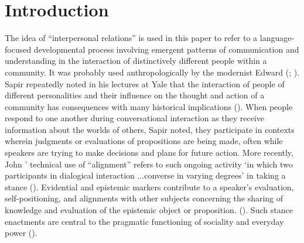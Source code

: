 \documentclass[output=paper]{langsci/langscibook}
\author{Ellen B. Basso \affiliation{University of Arizona}}
\begin{document}
\maketitle

\section{Introduction}\label{s:eb1} 

The idea of “interpersonal relations” is used in this paper to refer to a language-focused developmental process involving emergent patterns of communication and understanding in the interaction of distinctively different people within a community. It was probably used anthropologically by the modernist Edward \citeauthor{Sapir1932} (\citeyear{Sapir1932}; \citealt{Basso1998}).  Sapir repeatedly noted in his lectures at Yale that the interaction of people of different personalities and their influence on the thought and action of a community has consequences with many historical implications (\citealt[204]{Sapir1993}). When people respond to one another during conversational interaction as they receive information about the worlds of others, Sapir noted, they participate in contexts wherein  judgments or evaluations of propositions are being made, often while speakers are trying to make decisions and plans for future action.  More recently,   John \citeauthor{DuBois2004}’ technical use of “alignment” refers to such ongoing activity   ‘in which two participants in dialogical interaction ...converse in varying degrees’  in taking a stance (\citeyear[22--23]{DuBois2004}).  Evidential and epistemic markers contribute to a speaker’s evaluation, self-positioning, and alignments with other subjects concerning the sharing of knowledge and evaluation of the epistemic object or proposition. (\citealt[24]{DuBois2007}).  Such stance enactments are central to the pragmatic functioning  of sociality and everyday power (\citealt[5--6]{Ameka2004}).   
\end{document}
